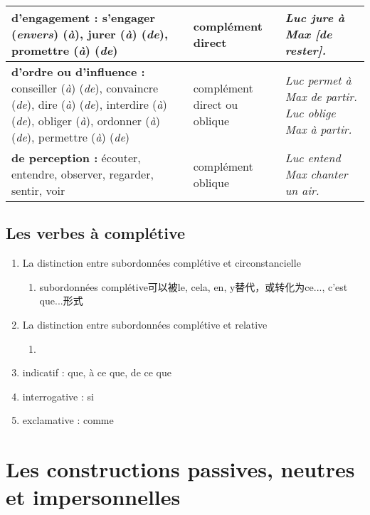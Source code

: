 \documentclass[UTF8]{report}
\begin{document}
\begin{table}[H]
\begin{adjustbox}{max width=\textwidth}
\begin{tabular}{| L{6.8cm} | L{2.5cm} | L{5.5cm} |}
        \hline
        \textbf{d’engagement :} \newline s’engager (\textit{envers}) (\textit{à}), jurer (\textit{à}) (\textit{de}), promettre (\textit{à}) (\textit{de}) & complément direct & \textit{Luc jure à Max [de rester].} \\
        \hline
        \textbf{d’ordre ou d’influence :} \newline conseiller (\textit{à}) (\textit{de}), convaincre (\textit{de}), dire (\textit{à}) (\textit{de}), interdire (\textit{à}) (\textit{de}), obliger (\textit{à}), ordonner (\textit{à}) (\textit{de}), permettre (\textit{à}) (\textit{de}) & complément direct ou oblique & \textit{Luc permet à Max de partir.} \newline \textit{Luc oblige Max à partir.} \\
        \hline
        \textbf{de perception :} \newline écouter, entendre, observer, regarder, sentir, voir & complément oblique & \textit{Luc entend Max chanter un air.} \\
        \hline
        \end{tabular}
    \end{adjustbox}
\end{table}


\newpage
\subsection{Les verbes à complétive}
\begin{enumerate}
    \item La distinction entre subordonnées complétive et circonstancielle
    \begin{enumerate}
        \item subordonnées complétive可以被le, cela, en, y替代，或转化为ce..., c’est que...形式
    \end{enumerate}
    \item La distinction entre subordonnées complétive et relative
    \begin{enumerate}
        \item 
    \end{enumerate}
    \item indicatif : que, à ce que, de ce que
    \item interrogative : si
    \item exclamative : comme
\end{enumerate}

\section{Les constructions passives, neutres et impersonnelles}
\end{document}
